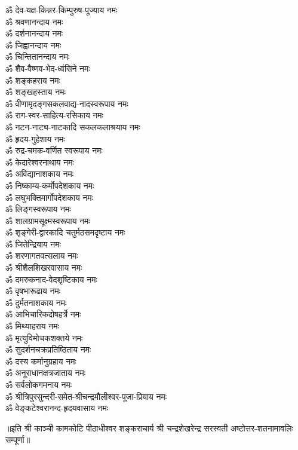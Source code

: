 \begin{flushleft}
\begin{multicols}{2}
ॐ देव-यक्ष-किन्नर-किम्पुरुष-पूज्याय नमः\\
ॐ श्रवणानन्दाय नमः\\
ॐ दर्शनानन्दाय नमः\\
ॐ जिह्वानन्दाय नमः\\
ॐ चिन्तितानन्दाय नमः\\
ॐ शैव-वैष्णव-भेद-ध्वंसिने नमः\\
ॐ शङ्कहराय नमः\hfill{}\\
ॐ शङ्खहस्ताय नमः\\
ॐ वीणामृदङ्गसकलवाद्य-नादस्वरूपाय नमः\\
ॐ राग-स्वर-साहित्य-रसिकाय नमः\\
ॐ नटन-नाट्य-नाटकादि सकलकलाश्रयाय नमः\\
ॐ हृदय-गुहेशाय नमः\\
ॐ रुद्र-चमक-वर्णित स्वरूपाय नमः\\
ॐ केदारेश्वरनाथाय नमः\\
ॐ अविद्यानाशकाय नमः\\
ॐ निष्काम्य-कर्मोपदेशकाय नमः\\
ॐ लघुभक्तिमार्गोपदेशकाय नमः\hfill{}\\
ॐ लिङ्गस्वरूपाय नमः\\
ॐ शालग्रामसूक्ष्मस्वरूपाय नमः\\
ॐ शृङ्गेरी-द्वारकादि चतुर्मठसमदृष्टाय नमः\\
ॐ जितेन्द्रियाय नमः\\
ॐ शरणागतवत्सलाय नमः\\
ॐ श्रीशैलशिखरवासाय नमः\\
ॐ दमरुकनाद-वेदशृष्टिकाय नमः\\
ॐ वृषभारूढाय नमः\\
ॐ दुर्मतनाशकाय नमः\\
ॐ आभिचारिकदोषहर्त्रे नमः\hfill{}\\
ॐ मिथ्याहराय नमः\\
ॐ मृत्युविमोचकशक्तये नमः\\
ॐ सुदर्शनचक्रप्रतिष्ठिताय नमः\\
ॐ दस्य कर्मानुग्रहाय नमः\\
ॐ अनूराधानक्षत्रजाताय नमः\\
ॐ सर्वलोकगमनाय नमः\\
ॐ श्रीत्रिपुरसुन्दरी-समेत-श्रीचन्द्रमौलीश्वर-पूजा-प्रियाय नमः\\
ॐ वेङ्कटेश्वरानन्द-हृदयवासाय नमः\\
\end{multicols}
\end{flushleft}
\centerline{॥इति श्री काञ्ची कामकोटि पीठाधीश्वर शङ्कराचार्य श्री चन्द्रशेखरेन्द्र सरस्वती अष्टोत्तर-शतनामावलिः सम्पूर्णा॥}
